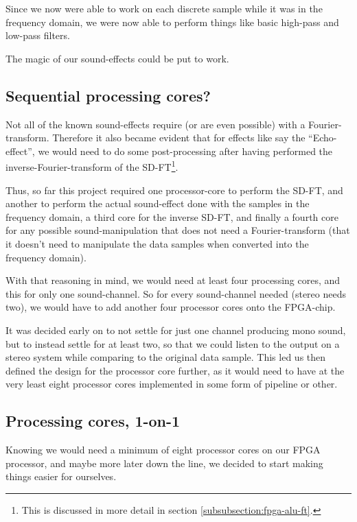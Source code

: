 Since we now were able to work on each discrete sample while it was in the
frequency domain, we were now able to perform things like basic high-pass and
low-pass filters.

The magic of our sound-effects could be put to work.

\FloatBarrier
\subsection{Sequential processing cores?}

Not all of the known sound-effects require (or are even possible) with a
Fourier-transform. Therefore it also became evident that for effects like say
the ``Echo-effect'', we would need to do some post-processing after having
performed the inverse-Fourier-transform of the 
SD-FT\footnote{This is discussed in more detail in section
\ref{subsubsection:fpga-alu-ft}.}.

Thus, so far this project required one processor-core to perform the SD-FT, and
another to perform the actual sound-effect done with the samples in the
frequency domain, a third core for the inverse SD-FT, and finally a fourth core
for any possible sound-manipulation that does not need a Fourier-transform (that
it doesn't need to manipulate the data samples when converted into the frequency
domain).

With that reasoning in mind, we would need at least four processing cores, and
this for only one sound-channel. So for every sound-channel needed (stereo needs
two), we would have to add another four processor cores onto the FPGA-chip.

It was decided early on to not settle for just one channel producing mono sound,
but to instead settle for at least two, so that we could listen to the output
on a stereo system while comparing to the original data sample. This led us then
defined the design for the processor core further, as it would need to have
at the very least eight processor cores implemented in some form of pipeline or
other.

\FloatBarrier
\subsection{Processing cores, 1-on-1}

Knowing we would need a minimum of eight processor cores on our FPGA processor,
and maybe more later down the line, we decided to start making things easier
for ourselves.

